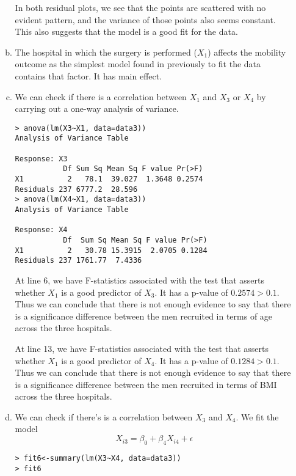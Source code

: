 \documentclass[10pt]{article}
\begin{document}
\begin{enumerate}
\begin{enumerate}[a)]
		In both residual plots, we see that the  points are scattered with no evident pattern, and the variance of those points also seems constant. This also suggests that the model is a good fit for the data. 
		
		\item The hospital in which the surgery is performed ($X_1$) affects the mobility outcome as the simplest model found in previously to fit the data contains that factor. It has main effect. 
		\item We can check if there is a correlation between $X_1$ and $X_3$ or $X_4$ by carrying out a one-way analysis of variance.
		\begin{lstlisting}
> anova(lm(X3~X1, data=data3))
Analysis of Variance Table

Response: X3
           Df Sum Sq Mean Sq F value Pr(>F)
X1          2   78.1  39.027  1.3648 0.2574
Residuals 237 6777.2  28.596               
> anova(lm(X4~X1, data=data3))
Analysis of Variance Table

Response: X4
           Df  Sum Sq Mean Sq F value Pr(>F)
X1          2   30.78 15.3915  2.0705 0.1284
Residuals 237 1761.77  7.4336      
		\end{lstlisting} 
		At line 6, we have F-statistics associated with the test that asserts whether $X_1$ is a good predictor of $X_3$. It has a p-value of $0.2574 > 0.1$. Thus we can conclude that there is not enough evidence to say that there is a significance difference between the men recruited in terms of age across
the three hospitals.

	At line 13, we have F-statistics associated with the test that asserts whether $X_1$ is a good predictor of $X_4$. It has a p-value of $0.1284 > 0.1$. Thus we can conclude that there is not enough evidence to say that there is a significance difference between the men recruited in terms of BMI across
the three hospitals. 

		\item We can check if there's is a correlation between $X_3$ and $X_4$. We fit the model 
		\begin{displaymath}
			X_{i3} = \beta_0 + \beta_4X_{i4} + \epsilon
		\end{displaymath}
		\begin{lstlisting}
> fit6<-summary(lm(X3~X4, data=data3))
> fit6


\end{lstlisting}
\end{enumerate}
\end{enumerate}
\end{document}
